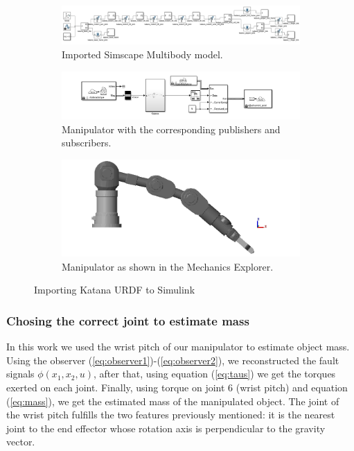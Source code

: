 \documentclass[a4paper, 10pt]{article}
\begin{document}
\begin{figure}
  \centering
  \begin{subfigure}[b]{\textwidth}
    \centering
    \includegraphics[width=\textwidth]{Figures/KatanaSimscape.png}
    \caption{Imported Simscape Multibody model.}
    \label{fig:KatanaSimulinkA}
  \end{subfigure}
  \begin{subfigure}[b]{\textwidth}
    \centering
    \includegraphics[width=\textwidth]{Figures/KatanaSimulinkROS.png}
    \caption{Manipulator with the corresponding publishers and subscribers.}
    \label{fig:KatanaSimulinkB}
  \end{subfigure}
  \begin{subfigure}[b]{0.65\textwidth}
    \centering
    \includegraphics[width=\textwidth]{Figures/KatanaMechanics.png}
    \caption{Manipulator as shown in the Mechanics Explorer.}
    \label{fig:KatanaSimulinkC}
  \end{subfigure}
  \caption{Importing Katana URDF to Simulink}
  \label{fig:KatanaSimulink}
\end{figure}

\subsubsection*{Chosing the correct joint to estimate mass}
In this work we used the wrist pitch of our manipulator to estimate object mass. Using the observer (\ref{eq:observer1})-(\ref{eq:observer2}), we reconstructed the fault signals $\phi(x_1, x_2, u)$, after that, using equation (\ref{eq:taus}) we get the torques exerted on each joint. Finally, using torque on joint 6 (wrist pitch) and equation (\ref{eq:mass}), we get the estimated mass of the manipulated object. The joint of the wrist pitch fulfills the two features previously mentioned: it is the nearest joint to the end effector whose rotation axis is perpendicular to the gravity vector.
\end{document}
